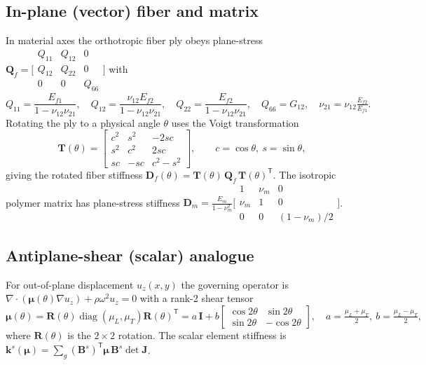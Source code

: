 \documentclass[11pt]{article}
\newcommand{\vB}{\mathbf{B}}
\newcommand{\vD}{\mathbf{D}}
\newcommand{\vQ}{\mathbf{Q}}
\newcommand{\vT}{\mathbf{T}}
\newcommand{\T}{^{\mathsf{T}}}
\begin{document}
\subsection{In-plane (vector) fiber and matrix}
In material axes the orthotropic fiber ply obeys plane-stress
$\vQ_f=\bigl[\begin{smallmatrix}Q_{11}&Q_{12}&0\\Q_{12}&Q_{22}&0\\0&0&Q_{66}
\end{smallmatrix}\bigr]$ with
\begin{equation}
  Q_{11}=\frac{E_{f1}}{1-\nu_{12}\nu_{21}},\quad
  Q_{12}=\frac{\nu_{12}E_{f2}}{1-\nu_{12}\nu_{21}},\quad
  Q_{22}=\frac{E_{f2}}{1-\nu_{12}\nu_{21}},\quad
  Q_{66}=G_{12},\quad \nu_{21}=\nu_{12}\tfrac{E_{f2}}{E_{f1}}.
\end{equation}
Rotating the ply to a physical angle $\theta$ uses the Voigt transformation
\begin{equation}
  \vT(\theta)=\begin{bmatrix}
  c^2 & s^2 & -2sc\\ s^2 & c^2 & 2sc\\ sc & -sc & c^2-s^2\end{bmatrix},
  \qquad c=\cos\theta,\ s=\sin\theta,
  \label{eq:Tmat}
\end{equation}
giving the rotated fiber stiffness $\vD_f(\theta)=\vT(\theta)\,\vQ_f\,
\vT(\theta)\T$. The isotropic polymer matrix has plane-stress stiffness
$\vD_m=\tfrac{E_m}{1-\nu_m^2}\bigl[\begin{smallmatrix}1&\nu_m&0\\\nu_m&1&0\\
0&0&(1-\nu_m)/2\end{smallmatrix}\bigr]$.

\subsection{Antiplane-shear (scalar) analogue}
For out-of-plane displacement $u_z(x,y)$ the governing operator is
$\nabla\!\cdot(\bm\mu(\theta)\nabla u_z)+\rho\omega^2u_z=0$ with a rank-2 shear
tensor
\begin{equation}
  \bm\mu(\theta)=\mathbf{R}(\theta)\operatorname{diag}(\mu_L,\mu_T)
  \mathbf{R}(\theta)\T
  = a\,\mathbf{I}+b\begin{bmatrix}\cos2\theta&\sin2\theta\\
  \sin2\theta&-\cos2\theta\end{bmatrix},\quad
  a=\tfrac{\mu_L+\mu_T}{2},\ b=\tfrac{\mu_L-\mu_T}{2},
  \label{eq:muscalar}
\end{equation}
where $\mathbf{R}(\theta)$ is the $2\times2$ rotation. The scalar element
stiffness is $\mathbf{k}^s(\bm\mu)=\sum_g(\vB^s)\T\bm\mu\,\vB^s\det\mathbf{J}$.
\end{document}
